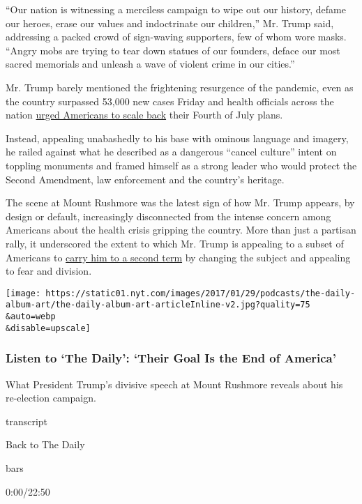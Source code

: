 ``Our nation is witnessing a merciless campaign to wipe out our history,
defame our heroes, erase our values and indoctrinate our children,'' Mr.
Trump said, addressing a packed crowd of sign-waving supporters, few of
whom wore masks. ``Angry mobs are trying to tear down statues of our
founders, deface our most sacred memorials and unleash a wave of violent
crime in our cities.''

Mr. Trump barely mentioned the frightening resurgence of the pandemic,
even as the country surpassed 53,000 new cases Friday and health
officials across the nation
\href{https://www.nytimes.com/2020/07/02/us/coronavirus-fourth-of-july.html}{urged
Americans to scale back} their Fourth of July plans.

Instead, appealing unabashedly to his base with ominous language and
imagery, he railed against what he described as a dangerous ``cancel
culture'' intent on toppling monuments and framed himself as a strong
leader who would protect the Second Amendment, law enforcement and the
country's heritage.

The scene at Mount Rushmore was the latest sign of how Mr. Trump
appears, by design or default, increasingly disconnected from the
intense concern among Americans about the health crisis gripping the
country. More than just a partisan rally, it underscored the extent to
which Mr. Trump is appealing to a subset of Americans to
\href{https://www.nytimes.com/2020/07/07/podcasts/the-daily/trump-mount-rushmore-speech.html}{carry
him to a second term} by changing the subject and appealing to fear and
division.

\texttt{[image: https://static01.nyt.com/images/2017/01/29/podcasts/the-daily-album-art/the-daily-album-art-articleInline-v2.jpg?quality=75\\\&auto=webp\\\&disable=upscale]}

\hypertarget{listen-to-the-daily-their-goal-is-the-end-of-america}{%
\subsubsection{Listen to `The Daily': `Their Goal Is the End of
America'}\label{listen-to-the-daily-their-goal-is-the-end-of-america}}

What President Trump's divisive speech at Mount Rushmore reveals about
his re-election campaign.

transcript

Back to The Daily

bars

0:00/22:50

